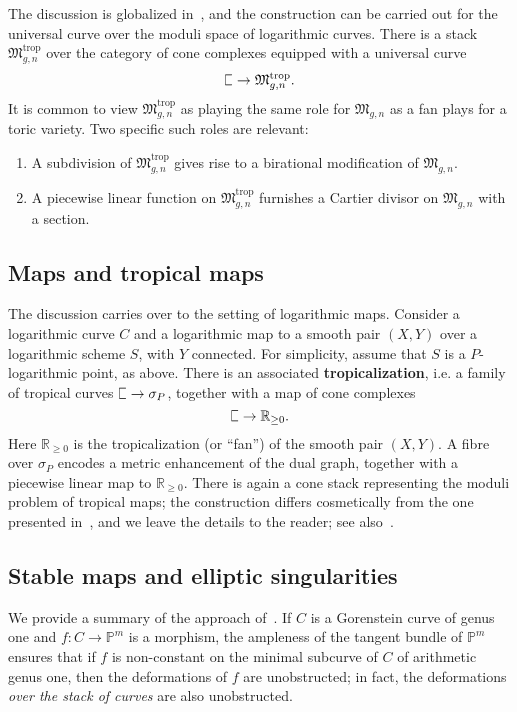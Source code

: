 \documentclass[11pt]{amsart}
\newcommand{\plC}{\scalebox{0.8}[1.3]{$\sqsubset$}}
\renewcommand{\to}{\rightarrow}
\newcommand{\RR}{\mathbb{R}}
\theoremstyle{definition}
\theoremstyle{definition}
\begin{document}
The discussion is globalized in~\cite{CavalieriChanUlirschWise}, and the construction can be carried out for the universal curve over the moduli space of logarithmic curves. There is a stack $\mathfrak M_{g,n}^{\mathrm{trop}}$ over the category of cone complexes equipped with a universal curve 
\[
\plC\to \mathfrak M_{g,n}^{\mathrm{trop}}.
\]
It is common to view $\mathfrak M_{g,n}^{\mathrm{trop}}$ as playing the same role for $\mathfrak M_{g,n}$ as a fan plays for a toric variety. Two specific such roles are relevant:
\begin{enumerate}
\item A subdivision of $\mathfrak M_{g,n}^{\mathrm{trop}}$ gives rise to a birational modification of $\mathfrak M_{g,n}$.
\item A piecewise linear function on $\mathfrak M_{g,n}^{\mathrm{trop}}$ furnishes a Cartier divisor on $\mathfrak M_{g,n}$ with a section.
\end{enumerate}

\subsection{Maps and tropical maps}The discussion carries over to the setting of logarithmic maps. Consider a logarithmic curve $C$ and a logarithmic map to a smooth pair $(X,Y)$ over a logarithmic scheme $S$, with $Y$ connected. For simplicity, assume that $S$ is a $P$-logarithmic point, as above. There is an associated \textbf{tropicalization}, i.e. a family of tropical curves $\plC \to \sigma_P$, together with a map of cone complexes
\[
\plC\to \RR_{\geq 0}.
\]
Here $\RR_{\geq 0}$ is the tropicalization (or ``fan'') of the smooth pair $(X,Y)$. A fibre over $\sigma_P$ encodes a metric enhancement of the dual graph, together with a piecewise linear map to $\RR_{\geq 0}$. There is again a cone stack representing the moduli problem of tropical maps; the construction differs cosmetically from the one presented in~\cite{CavalieriChanUlirschWise}, and we leave the details to the reader; see also~\cite{GrossSiebertLog}.

\subsection{Stable maps and elliptic singularities} We provide a summary of the approach of~\cite{RSPW}. If $C$ is a Gorenstein curve of genus one and $f:C\to \mathbb P^m$ is a morphism, the ampleness of the tangent bundle of $\mathbb P^m$ ensures that if $f$ is non-constant on the minimal subcurve of $C$ of arithmetic genus one, then the deformations of $f$ are unobstructed; in fact, the deformations \textit{over the stack of curves} are also unobstructed. 
\end{document}
